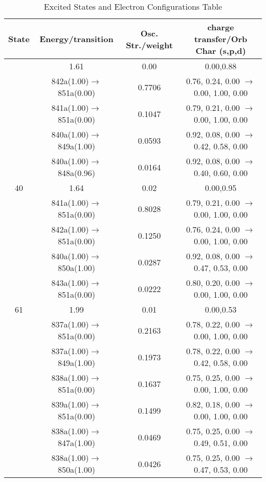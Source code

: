 \documentclass[10pt,a4paper]{article}
\begin{document}
 \centering
 \begin{longtable}{c|c|c|c}
   \caption{Excited States and Electron Configurations Table}
   \hline
     State & Energy/transition & Osc. Str./weight & charge transfer/Orb Char (s,p,d)\\
    \hline 
 
   \endfirsthead 
   \hline
   \endhead
   \hline
   \endfoot
   \endlastfoot 
38 &	 1.61 &	 0.00 &	 0.00,0.88 \\ 
  	& 842a(1.00)$\rightarrow$851a(0.00) &	 0.7706 &	 0.76, 0.24, 0.00 $\rightarrow$ 0.00, 1.00, 0.00 \\ 
 	& 841a(1.00)$\rightarrow$851a(0.00) &	 0.1047 &	 0.79, 0.21, 0.00 $\rightarrow$ 0.00, 1.00, 0.00 \\ 
 	& 840a(1.00)$\rightarrow$849a(1.00) &	 0.0593 &	 0.92, 0.08, 0.00 $\rightarrow$ 0.42, 0.58, 0.00 \\ 
 	& 840a(1.00)$\rightarrow$848a(0.96) &	 0.0164 &	 0.92, 0.08, 0.00 $\rightarrow$ 0.40, 0.60, 0.00 \\ 
 \hline40 &	 1.64 &	 0.02 &	 0.00,0.95 \\ 
  	& 841a(1.00)$\rightarrow$851a(0.00) &	 0.8028 &	 0.79, 0.21, 0.00 $\rightarrow$ 0.00, 1.00, 0.00 \\ 
 	& 842a(1.00)$\rightarrow$851a(0.00) &	 0.1250 &	 0.76, 0.24, 0.00 $\rightarrow$ 0.00, 1.00, 0.00 \\ 
 	& 840a(1.00)$\rightarrow$850a(1.00) &	 0.0287 &	 0.92, 0.08, 0.00 $\rightarrow$ 0.47, 0.53, 0.00 \\ 
 	& 843a(1.00)$\rightarrow$851a(0.00) &	 0.0222 &	 0.80, 0.20, 0.00 $\rightarrow$ 0.00, 1.00, 0.00 \\ 
 \hline61 &	 1.99 &	 0.01 &	 0.00,0.53 \\ 
  	& 837a(1.00)$\rightarrow$851a(0.00) &	 0.2163 &	 0.78, 0.22, 0.00 $\rightarrow$ 0.00, 1.00, 0.00 \\ 
 	& 837a(1.00)$\rightarrow$849a(1.00) &	 0.1973 &	 0.78, 0.22, 0.00 $\rightarrow$ 0.42, 0.58, 0.00 \\ 
 	& 838a(1.00)$\rightarrow$851a(0.00) &	 0.1637 &	 0.75, 0.25, 0.00 $\rightarrow$ 0.00, 1.00, 0.00 \\ 
 	& 839a(1.00)$\rightarrow$851a(0.00) &	 0.1499 &	 0.82, 0.18, 0.00 $\rightarrow$ 0.00, 1.00, 0.00 \\ 
 	& 838a(1.00)$\rightarrow$847a(1.00) &	 0.0469 &	 0.75, 0.25, 0.00 $\rightarrow$ 0.49, 0.51, 0.00 \\ 
 	& 838a(1.00)$\rightarrow$850a(1.00) &	 0.0426 &	 0.75, 0.25, 0.00 $\rightarrow$ 0.47, 0.53, 0.00 \\ 

\end{longtable}
\end{document}
